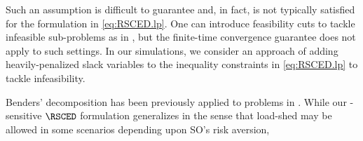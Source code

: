 


Such an assumption is difficult to guarantee and, in fact, is not typically satisfied for the \RSCED{} formulation in \eqref{eq:RSCED.lp}. One can introduce feasibility cuts to tackle infeasible sub-problems as in \cite{grothey1999note}, but the finite-time convergence guarantee does not apply to such settings. In our simulations, we consider an approach of adding heavily-penalized slack variables to the inequality constraints in \eqref{eq:RSCED.lp} to tackle infeasibility.


Benders' decomposition has been previously applied to \SCED{} problems in \cite{liu2015computational,shi2022scenario}. While our \CVaR-sensitive $\RSCED$ formulation generalizes \CSCED{} in the sense that load-shed may be allowed in some scenarios depending upon SO's risk aversion, 



